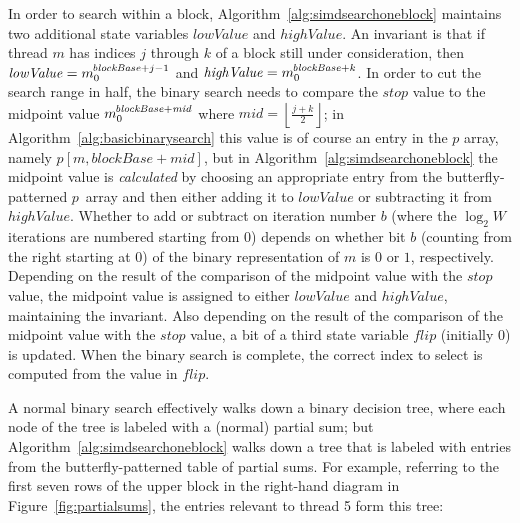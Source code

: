 \documentclass[10pt,nohyperref]{sigplanconf}
\newcommand*\Var[1]{{\mathit{#1}}}
\begin{document}
In order to search within a block, Algorithm~\ref{alg:simdsearchoneblock} maintains
two additional state variables $\Var{lowValue}$
and $\Var{highValue}$.  An invariant is that if thread $m$ has
indices $j$ through $k$ of a block still under consideration, then $\Var{lowValue} = \Z{m}{0}{\Var{blockBase}+j-1}$
and $\Var{highValue} = \Z{m}{0}{\Var{blockBase}+k}$.  In order to cut the search range in half, the binary search needs to
compare the $\Var{stop}$ value to the midpoint value $\Z{m}{0}{\Var{blockBase}+\Var{mid}}$
where $\Var{mid}=\left\lfloor \frac{j+k}{2} \right\rfloor$; in Algorithm~\ref{alg:basicbinarysearch}
this value is of course an entry in the $p$ array, namely $p[m, \Var{blockBase}+\Var{mid}]$,
but in Algorithm~\ref{alg:simdsearchoneblock} the midpoint value is \emph{calculated} by choosing an appropriate entry from
the butterfly-patterned $p$~array and then either adding it to $\Var{lowValue}$ or subtracting it from $\Var{highValue}$.
Whether to add or subtract on iteration number $b$ (where the $\log_2 W$ iterations are numbered starting from 0)
depends on whether bit $b$ (counting from the right starting at 0) of the binary representation
of $m$ is $0$ or $1$, respectively.  Depending on the result of the comparison of the midpoint value
with the $\Var{stop}$ value,
the midpoint value is assigned to either $\Var{lowValue}$ and $\Var{highValue}$, maintaining the invariant.
Also depending on the result of the comparison of the midpoint value
with the $\Var{stop}$ value, a bit of a third state variable $\Var{flip}$ (initially $0$) is updated.
When the binary search is complete, the correct index to select is computed from the value in $\Var{flip}$.

A normal binary search effectively walks down a binary decision tree,
where each node of the tree is labeled with a (normal) partial sum; but Algorithm~\ref{alg:simdsearchoneblock} walks
down a tree that is labeled with entries from the butterfly-patterned table of partial sums.
For example, referring to the first seven rows of the upper block in the right-hand diagram in Figure~\ref{fig:partialsums},
the entries relevant to thread 5 form this tree:

\newcommand\centerit[1]{\vbox to 0pt{\vss\hbox to 0pt{\hss#1\hss}\vss}}
\end{document}
